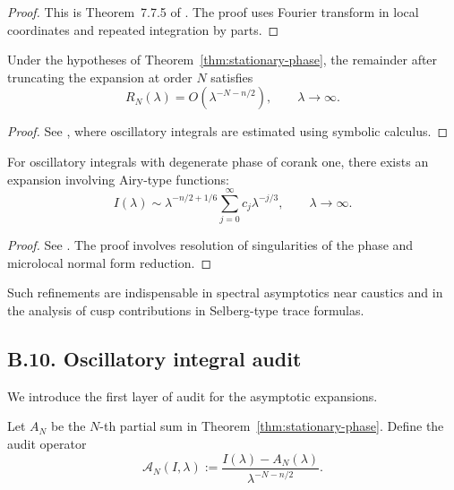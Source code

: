 \begin{proof}
This is Theorem~7.7.5 of \cite{HormanderI}. The proof uses Fourier transform in local coordinates and repeated integration by parts.
\end{proof}

\begin{lemma}
\label{lem:error-term}
Under the hypotheses of Theorem~\ref{thm:stationary-phase}, the remainder after truncating the expansion at order $N$ satisfies
\[
R_N(\lambda) = O(\lambda^{-N-n/2}), \qquad \lambda \to \infty.
\]
\end{lemma}

\begin{proof}
See \cite[Chapter~VIII]{Stein}, where oscillatory integrals are estimated using symbolic calculus.
\end{proof}

\begin{theorem}
\label{thm:ikeda}
For oscillatory integrals with degenerate phase of corank one, there exists an expansion involving Airy-type functions:
\[
I(\lambda) \sim \lambda^{-n/2+1/6} \sum_{j=0}^\infty c_j \lambda^{-j/3}, \qquad \lambda \to \infty.
\]
\end{theorem}

\begin{proof}
See \cite{IkedaWatanabe}. The proof involves resolution of singularities of the phase and microlocal normal form reduction.
\end{proof}

\begin{remark}
Such refinements are indispensable in spectral asymptotics near caustics and in the analysis of cusp contributions in Selberg-type trace formulas.
\end{remark}

\medskip

\subsection*{B.10. Oscillatory integral audit}
\label{appB:audit-intro}

We introduce the first layer of audit for the asymptotic expansions.

\begin{definition}
\label{def:audit-op}
Let $A_N$ be the $N$-th partial sum in Theorem~\ref{thm:stationary-phase}. Define the audit operator
\[
\mathcal{A}_N(I,\lambda) := \frac{I(\lambda) - A_N(\lambda)}{\lambda^{-N-n/2}}.
\]
\end{definition}

